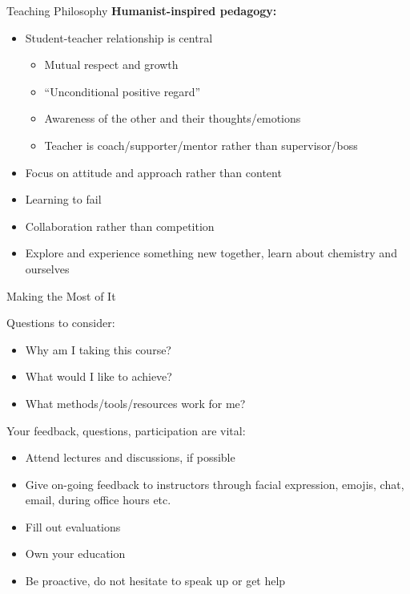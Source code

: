 \documentclass[11pt]{beamer}
\begin{document}
\begin{frame}{Teaching Philosophy}
  \textbf{Humanist-inspired pedagogy:}
  \begin{itemize}
  \item Student-teacher relationship is central
    \begin{itemize}
    \item Mutual respect and growth
    \item ``Unconditional positive regard''
    \item Awareness of the other and their thoughts/emotions
    \item Teacher is coach/supporter/mentor rather than supervisor/boss
    \end{itemize}
  \item Focus on attitude and approach rather than content
  \item Learning to fail
  \item Collaboration rather than competition
  \item Explore and experience something new together, learn about
    chemistry and ourselves
  \end{itemize}
\end{frame}

\begin{frame}{Making the Most of It}

  Questions to consider:
  \begin{itemize}
  \item Why am I taking this course?
  \item What would I like to achieve?
  \item What methods/tools/resources work for me?
  \end{itemize}

  Your feedback, questions, participation are vital:
  \begin{itemize}
  \item Attend lectures and discussions, if possible
  \item Give on-going feedback to instructors through facial expression,
    emojis, chat, email, during office hours etc.
  \item Fill out evaluations
  \item Own your education
  \item Be proactive, do not hesitate to speak up or get help
  \end{itemize}

\end{frame}
\end{document}
